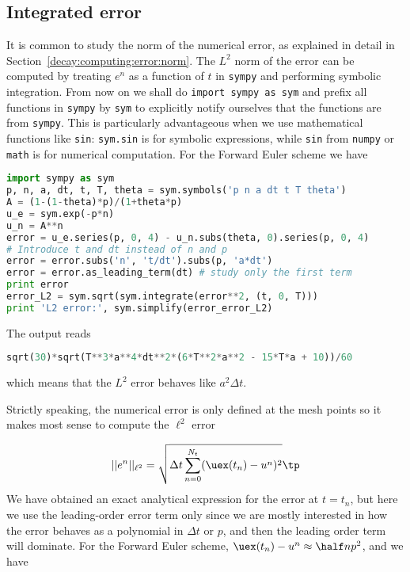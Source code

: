 \documentclass[graybox,sectrefs,envcountresetchap,open=right,final]{svmonodo}
\begin{document}
\subsection{Integrated error}
\label{decay:analysis:gobal:error_int}

It is common to study the norm of the numerical error, as
explained in detail in Section~\ref{decay:computing:error:norm}.
The $L^2$ norm of the error can be computed by treating $e^n$ as a function
of $t$ in \texttt{sympy} and performing symbolic integration.
From now on we shall do \texttt{import sympy as sym} and prefix all functions
in \texttt{sympy} by \texttt{sym} to explicitly notify ourselves that the functions
are from \texttt{sympy}. This is particularly advantageous when we use
mathematical functions like \texttt{sin}: \texttt{sym.sin} is for symbolic expressions,
while \texttt{sin} from \texttt{numpy} or \texttt{math} is for numerical computation.
For the Forward Euler scheme we have

\begin{lstlisting}[language=Python,style=blue1_bluegreen]
import sympy as sym
p, n, a, dt, t, T, theta = sym.symbols('p n a dt t T theta')
A = (1-(1-theta)*p)/(1+theta*p)
u_e = sym.exp(-p*n)
u_n = A**n
error = u_e.series(p, 0, 4) - u_n.subs(theta, 0).series(p, 0, 4)
# Introduce t and dt instead of n and p
error = error.subs('n', 't/dt').subs(p, 'a*dt')
error = error.as_leading_term(dt) # study only the first term
print error
error_L2 = sym.sqrt(sym.integrate(error**2, (t, 0, T)))
print 'L2 error:', sym.simplify(error_error_L2)
\end{lstlisting}
The output reads

\begin{lstlisting}[language=Python,style=blue1_bluegreen]
sqrt(30)*sqrt(T**3*a**4*dt**2*(6*T**2*a**2 - 15*T*a + 10))/60
\end{lstlisting}
which means that the $L^2$ error behaves like $a^2\Delta t$.

Strictly speaking, the numerical error is only defined at the
mesh points so it makes most sense to compute the
$\ell^2$ error

\[ ||e^n||_{\ell^2} = \sqrt{\Delta t\sum_{n=0}^{N_t} ({\uex}(t_n) - u^n)^2}
\tp \]
We have obtained an exact analytical expression for the error at
$t=t_n$, but here we use the leading-order error term only since we
are mostly interested in how the error behaves as a polynomial in
$\Delta t$ or $p$, and then the leading order term will dominate.  For
the Forward Euler scheme, $\uex(t_n) - u^n \approx {\half}np^2$, and
we have
\end{document}
